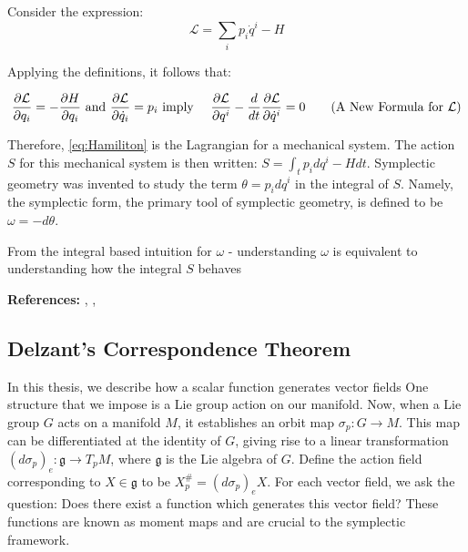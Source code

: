 \noindent Consider the expression:
\begin{equation}
\mathcal{L} = \sum_{i} p_{i} \dot{q}^{i} - H
\label{eq:Hamiliton}
\end{equation}

\noindent Applying the definitions, it follows that:

\begin{align}
\frac{\partial \mathcal{L}}{\partial q_{i}} = -\frac{\partial H}{\partial q_{i}} \text{ and } \frac{\partial \mathcal{L}}{\partial \dot{q}_{i}} = p_{i} \text{ imply } && \frac{\partial \mathcal{L}}{\partial q^{i}} - \frac{d}{dt} \frac{\partial \mathcal{L}}{\partial \dot{q}^{i}} = 0
\tag{A New Formula for $\mathcal{L}$}
\end{align}

\noindent Therefore, \ref{eq:Hamiliton} is the Lagrangian for a mechanical system. The action $S$ for this mechanical system is then written: $S = \int_{t} p_{i} dq^{i} - H dt \label{SymplecticPot}$. 
Symplectic geometry was invented to study the term $\theta = p_{i} dq^{i}$ in the integral of $S$. Namely, the symplectic form, the primary tool of symplectic geometry, is defined to be $\omega = -d \theta$. 

\begin{remark}
From the integral based intuition for $\omega$ - understanding $\omega$ is equivalent to understanding how the integral $S$ behaves
\end{remark}

\noindent \textbf{References: } \textcite{Arnold2010}, \textcite{Terek2020}, \textcite{Feynman:1494701}

\subsection{Delzant's Correspondence Theorem}
In this thesis, we describe how a scalar function generates vector fields One structure that we impose is a Lie group action on our manifold. Now, when a Lie group $G$ acts on a manifold $M$, it establishes an orbit map $\sigma_{p}: G \to M$. This map can be differentiated at the identity of $G$, giving rise to a linear transformation $\left( d \sigma_{p} \right)_{e} \colon \mathfrak{g} \to T_p M$, where $\mathfrak{g}$ is the Lie algebra of $G$. Define the action field corresponding to $X \in \mathfrak{g}$ to be $X^{\#}_{p} = \left( d \sigma_{p} \right)_{e} X$. For each vector field, we ask the question: Does there exist a function which generates this vector field? These functions are known as moment maps and are crucial to the symplectic framework. 

